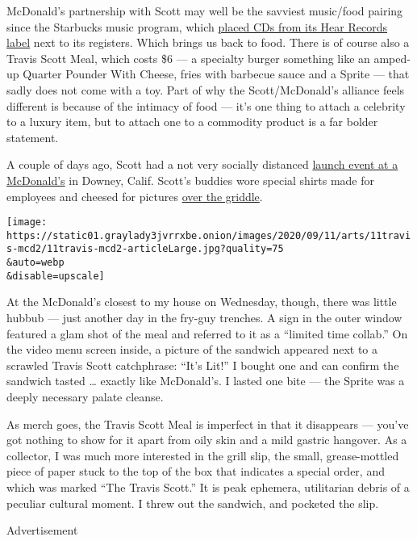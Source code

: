 McDonald's partnership with Scott may well be the savviest music/food
pairing since the Starbucks music program, which
\href{https://www.nytimes3xbfgragh.onion/2004/11/03/arts/music/would-you-like-an-extra-shot-of-music-with-that-macchiato.html}{placed
CDs from its Hear Records label} next to its registers. Which brings us
back to food. There is of course also a Travis Scott Meal, which costs
\$6 --- a specialty burger something like an amped-up Quarter Pounder
With Cheese, fries with barbecue sauce and a Sprite --- that sadly does
not come with a toy. Part of why the Scott/McDonald's alliance feels
different is because of the intimacy of food --- it's one thing to
attach a celebrity to a luxury item, but to attach one to a commodity
product is a far bolder statement.

A couple of days ago, Scott had a not very socially distanced
\href{https://losangeles.cbslocal.com/2020/09/08/rapper-travis-scott-mobbed-by-fans-at-downey-mcdonalds/}{launch
event at a McDonald's} in Downey, Calif. Scott's buddies wore special
shirts made for employees and cheesed for pictures
\href{https://www.instagram.com/p/CE5af3pJCR3/?utm_source=ig_web_copy_link}{over
the griddle}.

\texttt{[image: https://static01.graylady3jvrrxbe.onion/images/2020/09/11/arts/11travis-mcd2/11travis-mcd2-articleLarge.jpg?quality=75\\\&auto=webp\\\&disable=upscale]}

At the McDonald's closest to my house on Wednesday, though, there was
little hubbub --- just another day in the fry-guy trenches. A sign in
the outer window featured a glam shot of the meal and referred to it as
a ``limited time collab.'' On the video menu screen inside, a picture of
the sandwich appeared next to a scrawled Travis Scott catchphrase:
``It's Lit!'' I bought one and can confirm the sandwich tasted \ldots{}
exactly like McDonald's. I lasted one bite --- the Sprite was a deeply
necessary palate cleanse.

As merch goes, the Travis Scott Meal is imperfect in that it disappears
--- you've got nothing to show for it apart from oily skin and a mild
gastric hangover. As a collector, I was much more interested in the
grill slip, the small, grease-mottled piece of paper stuck to the top of
the box that indicates a special order, and which was marked ``The
Travis Scott.'' It is peak ephemera, utilitarian debris of a peculiar
cultural moment. I threw out the sandwich, and pocketed the slip.

Advertisement

